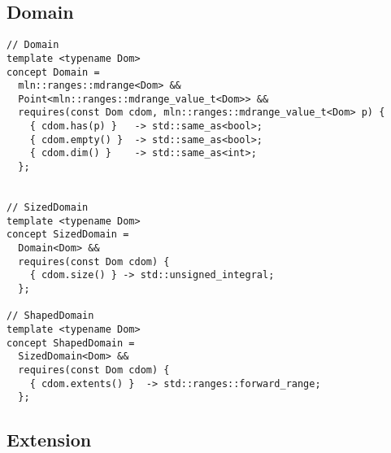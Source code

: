 \subsection{Domain}

\begin{verbatim}
// Domain
template <typename Dom>
concept Domain =
  mln::ranges::mdrange<Dom> &&
  Point<mln::ranges::mdrange_value_t<Dom>> &&
  requires(const Dom cdom, mln::ranges::mdrange_value_t<Dom> p) {
    { cdom.has(p) }   -> std::same_as<bool>;
    { cdom.empty() }  -> std::same_as<bool>;
    { cdom.dim() }    -> std::same_as<int>;
  };


// SizedDomain
template <typename Dom>
concept SizedDomain =
  Domain<Dom> &&
  requires(const Dom cdom) {
    { cdom.size() } -> std::unsigned_integral;
  };

// ShapedDomain
template <typename Dom>
concept ShapedDomain =
  SizedDomain<Dom> &&
  requires(const Dom cdom) {
    { cdom.extents() }  -> std::ranges::forward_range;
  };
\end{verbatim}


\subsection{Extension}


